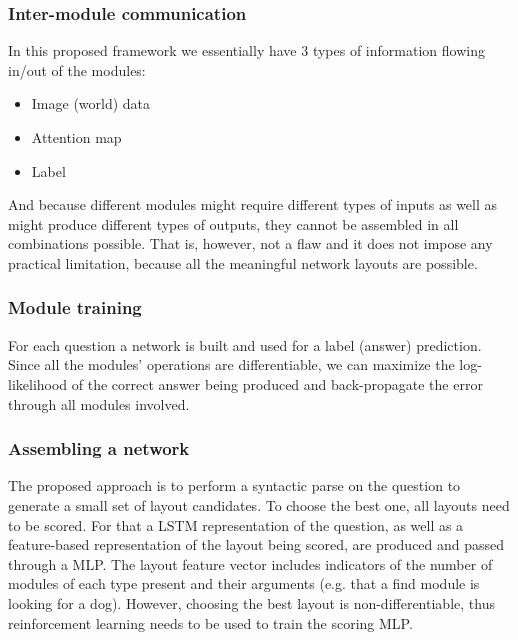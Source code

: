 \documentclass[a4paper,twocolumn]{article}
\begin{document}
\subsubsection*{Inter-module communication}
In this proposed framework we essentially have 3 types of information flowing in/out of the modules:
    \begin{itemize}
        \item Image (world) data
        \item Attention map
        \item Label
    \end{itemize}
And because different modules might require different types of inputs as well as might produce different types of outputs, they cannot be assembled in all combinations possible. That is, however, not a flaw and it does not impose any practical limitation, because all the meaningful network layouts are possible.

\subsubsection*{Module training}
For each question a network is built and used for a label (answer) prediction.  Since all the modules' operations are differentiable, we can maximize the log-likelihood of the correct answer being produced and back-propagate the error through all modules involved.

\subsubsection*{Assembling a network}
    The proposed approach is to perform a syntactic parse on the question to generate a small set of layout candidates. To choose the best one, all layouts need to be scored. For that a LSTM representation of the question, as well as a feature-based representation of the layout being scored, are produced and passed through a MLP. The layout feature vector includes indicators of the number of modules of each type present and their arguments (e.g. that a find module is looking for a dog).
 However, choosing the best layout is non-differentiable, thus reinforcement learning needs to be used to train the scoring MLP.
\end{document}
